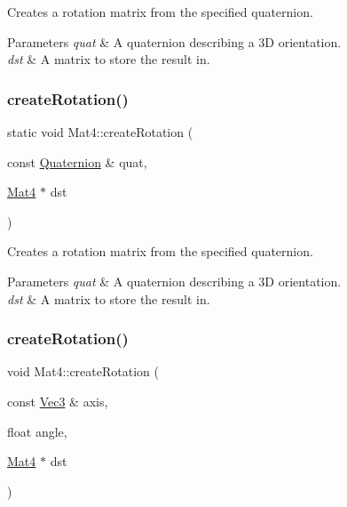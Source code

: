 Creates a rotation matrix from the specified quaternion.


\begin{DoxyParams}{Parameters}
{\em quat} & A quaternion describing a 3D orientation. \\
\hline
{\em dst} & A matrix to store the result in. \\
\hline
\end{DoxyParams}
\mbox{\label{classMat4_a9e95ec184dae30533def5217f8583616}} 
\subsubsection{\texorpdfstring{create\+Rotation()}{createRotation()}\hspace{0.1cm}{\footnotesize\ttfamily [2/4]}}
{\footnotesize\ttfamily static void Mat4\+::create\+Rotation (\begin{DoxyParamCaption}\item[{const \hyperlink{classQuaternion}{Quaternion} \&}]{quat,  }\item[{\hyperlink{classMat4}{Mat4} $\ast$}]{dst }\end{DoxyParamCaption})\hspace{0.3cm}{\ttfamily [static]}}

Creates a rotation matrix from the specified quaternion.


\begin{DoxyParams}{Parameters}
{\em quat} & A quaternion describing a 3D orientation. \\
\hline
{\em dst} & A matrix to store the result in. \\
\hline
\end{DoxyParams}
\mbox{\label{classMat4_ae4fab56ac8716d22d8fb979e756291c6}} 
\subsubsection{\texorpdfstring{create\+Rotation()}{createRotation()}\hspace{0.1cm}{\footnotesize\ttfamily [3/4]}}
{\footnotesize\ttfamily void Mat4\+::create\+Rotation (\begin{DoxyParamCaption}\item[{const \hyperlink{classVec3}{Vec3} \&}]{axis,  }\item[{float}]{angle,  }\item[{\hyperlink{classMat4}{Mat4} $\ast$}]{dst }\end{DoxyParamCaption})\hspace{0.3cm}{\ttfamily [static]}}

